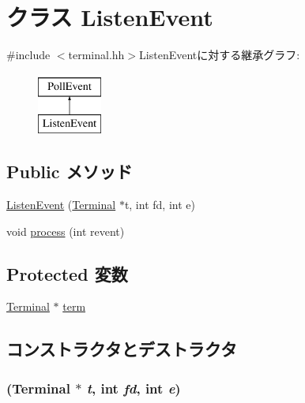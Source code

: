 \hypertarget{classTerminal_1_1ListenEvent}{
\section{クラス ListenEvent}
\label{classTerminal_1_1ListenEvent}
}


{\ttfamily \#include $<$terminal.hh$>$}ListenEventに対する継承グラフ:\begin{figure}[H]
\begin{center}
\leavevmode
\includegraphics[height=2cm]{classTerminal_1_1ListenEvent}
\end{center}
\end{figure}
\subsection*{Public メソッド}
\begin{DoxyCompactItemize}
\item 
\hyperlink{classTerminal_1_1ListenEvent_a687f8cca7418079b1450ace813cce771}{ListenEvent} (\hyperlink{classTerminal_1_1Terminal}{Terminal} $\ast$t, int fd, int e)
\item 
void \hyperlink{classTerminal_1_1ListenEvent_aedacbaeee0c89ceca526874c34f6b20b}{process} (int revent)
\end{DoxyCompactItemize}
\subsection*{Protected 変数}
\begin{DoxyCompactItemize}
\item 
\hyperlink{classTerminal_1_1Terminal}{Terminal} $\ast$ \hyperlink{classTerminal_1_1ListenEvent_a61b35a33209eb5f0de1f6f97f543ef92}{term}
\end{DoxyCompactItemize}


\subsection{コンストラクタとデストラクタ}
\hypertarget{classTerminal_1_1ListenEvent_a687f8cca7418079b1450ace813cce771}{
\subsubsection[{ListenEvent}]{ ({\bf Terminal} $\ast$ {\em t}, \/  int {\em fd}, \/  int {\em e})}}
\label{classTerminal_1_1ListenEvent_a687f8cca7418079b1450ace813cce771}



